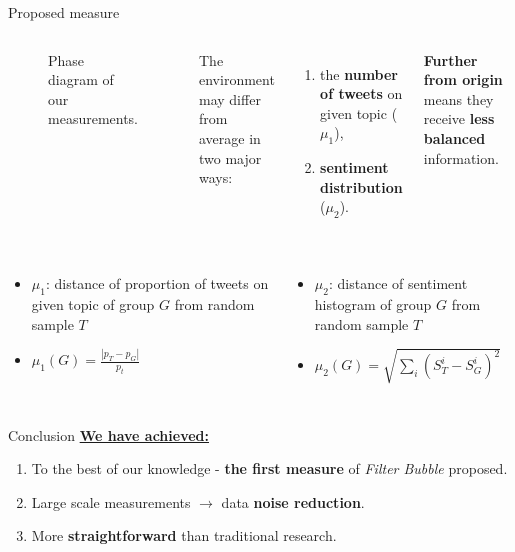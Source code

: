 \documentclass{beamer}
\begin{document}
\begin{frame}[fragile]
\begin{columns}[T]
\begin{column}{.63\textwidth}
\begin{block}{Proposed measure}
\begin{columns}
\begin{figure}
                \caption*{Phase diagram of our measurements.}
            \end{figure}
            The environment may differ from average in two major ways:
            \vspace{1cm}
            \begin{enumerate}
                \item the \textbf{number of tweets} on given topic ($\mu_1$),
                \item \textbf{sentiment distribution} ($\mu_2$).
            \end{enumerate}
            \vspace{1cm}
            \textbf{Further from origin} means they receive \textbf{less balanced} information.
    \end{columns}
    \begin{columns}
            \begin{itemize}
                \item $\mu_1$: distance of proportion of tweets on given topic of group $G$ from random sample $T$
                \item $\mu_1(G) = \frac{|p_T - p_G|}{p_t}$
            \end{itemize}
            \begin{itemize}
                \item $\mu_2$: distance of sentiment histogram of group $G$ from random sample $T$
                \item $\mu_2(G) = \sqrt{\sum_{i}{\left(S_T^i - S_G^i\right)^2}}$
            \end{itemize}
    \end{columns}
\end{block}
\vspace{-1.5cm}
\begin{customalertblock}{Conclusion}
    \vspace{-1cm}
    \underline{\textbf{We have achieved:}}
    \vspace{1cm}
    \begin{enumerate}
        \item To the best of our knowledge - \textbf{the first measure} of \textit{Filter Bubble} proposed.
        \item Large scale measurements $\rightarrow$ data \textbf{noise reduction}.
        \item More \textbf{straightforward} than traditional research.

\end{enumerate}
\end{customalertblock}
\end{column}
\end{columns}
\end{frame}
\end{document}
